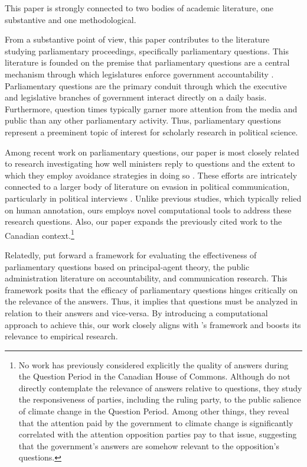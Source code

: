 {{This paper is strongly connected to two bodies of academic literature, one substantive and one methodological.

From a substantive point of view, this paper contributes to the literature studying parliamentary proceedings, specifically parliamentary questions. This literature is founded on the premise that parliamentary questions are a central mechanism through which legislatures enforce government accountability \citep{martin_2011}. Parliamentary questions are the primary conduit through which the executive and legislative branches of government interact directly on a daily basis. Furthermore, question times typically garner more attention from the media and public than any other parliamentary activity. Thus, parliamentary questions represent a preeminent topic of interest for scholarly research in political science.

Among recent work on parliamentary questions, our paper is most closely related to research investigating how well ministers reply to questions and the extent to which they employ avoidance strategies in doing so \citep{RASIAH2010664, bull_strawson_2019, kukec_2022}. These efforts are intricately connected to a larger body of literature on evasion in political communication, particularly in political interviews \citep{bull_mayer_1993, bull_1994, bull_1998, bull_2000, bull_2004, Waddle_Bull_2020}. Unlike previous studies, which typically relied on human annotation, ours employs novel computational tools to address these research questions. Also, our paper expands the previously cited work to the Canadian context.\footnote{No work has previously considered explicitly the quality of answers during the Question Period in the Canadian House of Commons. Although \citet{alvarez_morrier_2024} do not directly contemplate the relevance of answers relative to questions, they study the responsiveness of parties, including the ruling party, to the public salience of climate change in the Question Period. Among other things, they reveal that the attention paid by the government to climate change is significantly correlated with the attention opposition parties pay to that issue, suggesting that the government’s answers are somehow relevant to the opposition’s questions.}

Relatedly, \citet{maricut-akbik_2021} put forward a framework for evaluating the effectiveness of parliamentary questions based on principal-agent theory, the public administration literature on accountability, and communication research. This framework posits that the efficacy of parliamentary questions hinges critically on the relevance of the answers. Thus, it implies that questions must be analyzed in relation to their answers and vice-versa. By introducing a computational approach to achieve this, our work closely aligns with \citeauthor{maricut-akbik_2021}’s framework and boosts its relevance to empirical research.

}}
